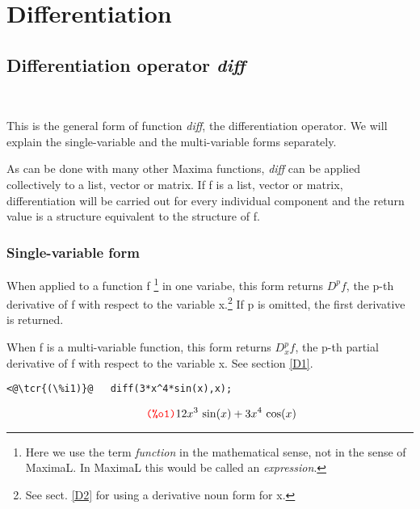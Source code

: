 \documentclass[../Maxima_Workbook.tex]{subfiles}
\begin{document}
	
\chapter{Differentiation}

\section{Differentiation operator \emph{diff}}

\lz {} \\
 \hfill \tcr{[function]}

\lz This is the general form of function \emph{diff}, the differentiation operator. We will explain the single-variable and the multi-variable forms separately.

\lz As can be done with many other Maxima functions, \emph{diff} can be applied collectively to a list, vector or matrix. If f is a list, vector or matrix, differentiation will be carried out for every individual component and the return value is a structure equivalent to the structure of f.

\subsection{Single-variable form}

\lz {}

\lz When applied to a function f \footnote{Here we use the term \emph{function} in the mathematical sense, not in the sense of MaximaL. In MaximaL this would be called an \emph{expression}.} in one variabe, this form returns $ D^pf $, the p-th derivative of f with respect to the variable x.\footnote{See sect. \ref{D2} for using a derivative noun form for x.} If p is omitted, the first derivative is returned. 

\lz When f is a multi-variable function, this form returns $ D_x^pf $, the p-th partial derivative of f with respect to the variable x. See section \ref{D1}.

\lz \begin{small}
\color{blue} \leqn
\begin{lstlisting}
<@\tcr{(\%i1)}@   diff(3*x^4*sin(x),x);
\end{lstlisting}
\vspace{-6mm} \[\tag*{\tcr{\ttfamily (\%o1)}} 12x^3 \, \sin(x) + 3x^4 \, \cos(x) \]
\color{black} \reqn
\end{small} \vspace{-7mm} 
\end{document}
